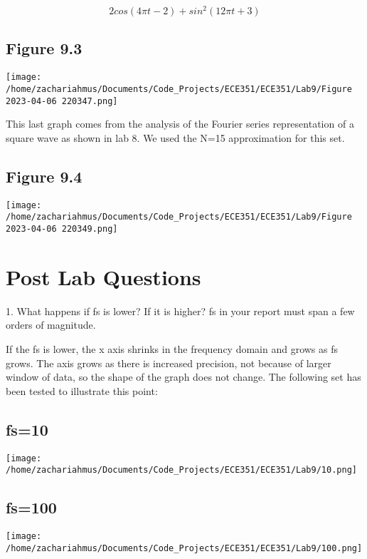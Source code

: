 \documentclass[12pt,a4paper]{article}
\begin{document}
$$2cos(4\pi t-2)+sin^2(12\pi t+3)$$
\begin{center}
	\subsection*{Figure 9.3}
	\texttt{[image: /home/zachariahmus/Documents/Code\_Projects/ECE351/ECE351/Lab9/Figure 2023-04-06 220347.png]}
\end{center}
\newpage
This last graph comes from the analysis of the Fourier series representation of a square wave as shown in lab 8. We used the N=15 approximation for this set. 
\begin{center}
	\subsection*{Figure 9.4}
	\texttt{[image: /home/zachariahmus/Documents/Code\_Projects/ECE351/ECE351/Lab9/Figure 2023-04-06 220349.png]}
\end{center}



\vspace{12pt}
	

\section*{Post Lab Questions}
1. What happens if fs is lower? If it is higher? fs in your report must span a few orders of
magnitude.\vspace*{12pt}

If the fs is lower, the x axis shrinks in the frequency domain and grows as fs grows. The axis grows as there is increased precision, not because of larger window of data, so the shape of the graph does not change. The following set has been tested to illustrate this point: 
\begin{center}
	\subsection*{fs=10}
	\texttt{[image: /home/zachariahmus/Documents/Code\_Projects/ECE351/ECE351/Lab9/10.png]}
\end{center}

\begin{center}
	\subsection*{fs=100}
	\texttt{[image: /home/zachariahmus/Documents/Code\_Projects/ECE351/ECE351/Lab9/100.png]}
\end{center}
\end{document}
